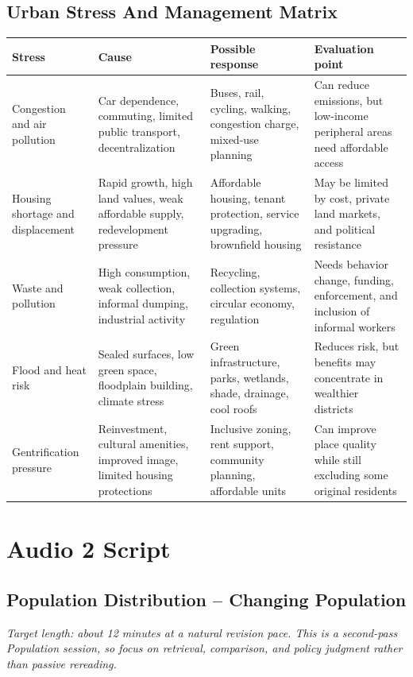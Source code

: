 \documentclass[11pt,a4paper]{article}
\begin{document}
\subsection{Urban Stress And Management Matrix}

\begin{tabularx}{\textwidth}{L{0.2\textwidth}Y Y Y}
\toprule
\textbf{Stress} & \textbf{Cause} & \textbf{Possible response} & \textbf{Evaluation point} \\
\midrule
Congestion and air pollution & Car dependence, commuting, limited public
transport, decentralization & Buses, rail, cycling, walking, congestion charge,
mixed-use planning & Can reduce emissions, but low-income peripheral areas
need affordable access \\
Housing shortage and displacement & Rapid growth, high land values, weak
affordable supply, redevelopment pressure & Affordable housing, tenant
protection, service upgrading, brownfield housing & May be limited by cost,
private land markets, and political resistance \\
Waste and pollution & High consumption, weak collection, informal dumping,
industrial activity & Recycling, collection systems, circular economy,
regulation & Needs behavior change, funding, enforcement, and inclusion of
informal workers \\
Flood and heat risk & Sealed surfaces, low green space, floodplain building,
climate stress & Green infrastructure, parks, wetlands, shade, drainage, cool
roofs & Reduces risk, but benefits may concentrate in wealthier districts \\
Gentrification pressure & Reinvestment, cultural amenities, improved image,
limited housing protections & Inclusive zoning, rent support, community
planning, affordable units & Can improve place quality while still excluding
some original residents \\
\bottomrule
\end{tabularx}

\section{Audio 2 Script}

\subsection{Population Distribution -- Changing Population}

\textit{Target length: about 12 minutes at a natural revision pace. This is a
second-pass Population session, so focus on retrieval, comparison, and policy
judgment rather than passive rereading.}
\end{document}
